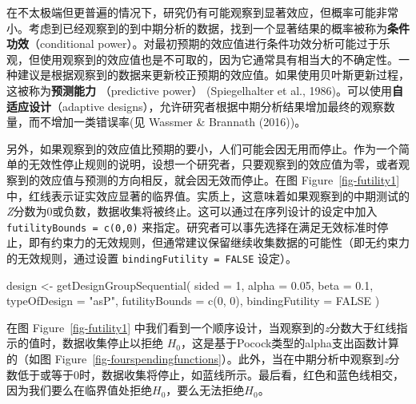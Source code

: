 \documentclass[
  letterpaper,
  DIV=11,
  numbers=noendperiod]{scrreprt}
\newenvironment{Shaded}{\begin{snugshade}}{\end{snugshade}}
\newcommand{\AttributeTok}[1]{\textcolor[rgb]{0.40,0.45,0.13}{#1}}
\newcommand{\ConstantTok}[1]{\textcolor[rgb]{0.56,0.35,0.01}{#1}}
\newcommand{\DecValTok}[1]{\textcolor[rgb]{0.68,0.00,0.00}{#1}}
\newcommand{\FloatTok}[1]{\textcolor[rgb]{0.68,0.00,0.00}{#1}}
\newcommand{\FunctionTok}[1]{\textcolor[rgb]{0.28,0.35,0.67}{#1}}
\newcommand{\NormalTok}[1]{\textcolor[rgb]{0.00,0.23,0.31}{#1}}
\newcommand{\OtherTok}[1]{\textcolor[rgb]{0.00,0.23,0.31}{#1}}
\newcommand{\StringTok}[1]{\textcolor[rgb]{0.13,0.47,0.30}{#1}}
\begin{document}
在不太极端但更普遍的情况下，研究仍有可能观察到显著效应，但概率可能非常小。考虑到已经观察到的到中期分析的数据，找到一个显著结果的概率被称为\textbf{条件功效}（conditional
power）。对最初预期的效应值进行条件功效分析可能过于乐观，但使用观察到的效应值也是不可取的，因为它通常具有相当大的不确定性。一种建议是根据观察到的数据来更新校正预期的效应值。如果使用贝叶斯更新过程，这被称为\textbf{预测能力}
（predictive power） (Spiegelhalter et al.,
1986)。可以使用\textbf{自适应设计}（adaptive
designs），允许研究者根据中期分析结果增加最终的观察数量，而不增加一类错误率(见
Wassmer \& Brannath (2016))。

另外，如果观察到的效应值比预期的要小，人们可能会因无用而停止。作为一个简单的无效性停止规则的说明，设想一个研究者，只要观察到的效应值为零，或者观察到的效应值与预测的方向相反，就会因无效而停止。在图
Figure~\ref{fig-futility1}
中，红线表示证实效应显著的临界值。实质上，这意味着如果观察到的中期测试的\emph{Z}分数为0或负数，数据收集将被终止。这可以通过在序列设计的设定中加入
\texttt{futilityBounds\ =\ c(0,0)}
来指定。研究者可以事先选择在满足无效标准时停止，即有约束力的无效规则，但通常建议保留继续收集数据的可能性（即无约束力的无效规则，通过设置
\texttt{bindingFutility\ =\ FALSE} 设定）。

\begin{Shaded}
\begin{Highlighting}[]
\NormalTok{design }\OtherTok{\textless{}{-}} \FunctionTok{getDesignGroupSequential}\NormalTok{(}
  \AttributeTok{sided =} \DecValTok{1}\NormalTok{,}
  \AttributeTok{alpha =} \FloatTok{0.05}\NormalTok{,}
  \AttributeTok{beta =} \FloatTok{0.1}\NormalTok{,}
  \AttributeTok{typeOfDesign =} \StringTok{"asP"}\NormalTok{,}
  \AttributeTok{futilityBounds =} \FunctionTok{c}\NormalTok{(}\DecValTok{0}\NormalTok{, }\DecValTok{0}\NormalTok{),}
  \AttributeTok{bindingFutility =} \ConstantTok{FALSE}
\NormalTok{)}
\end{Highlighting}
\end{Shaded}

在图 Figure~\ref{fig-futility1}
中我们看到一个顺序设计，当观察到的\emph{z}分数大于红线指示的值时，数据收集停止以拒绝
\(H_0\)，这是基于Pocock类型的alpha支出函数计算的（如图
Figure~\ref{fig-fourspendingfunctions}）。此外，当在中期分析中观察到\emph{z}分数低于或等于0时，数据收集将停止，如蓝线所示。最后看，红色和蓝色线相交，因为我们要么在临界值处拒绝\(H_0\)，要么无法拒绝\(H_0\)。
\end{document}
